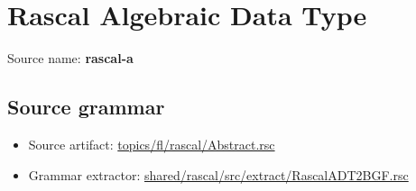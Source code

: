 \chapter{Rascal Algebraic Data Type}

 Source name: \textbf{rascal-a}

\section{Source grammar}

\begin{itemize}\item Source artifact: \href{http://github.com/grammarware/slps/blob/master/topics/fl/rascal/Abstract.rsc}{topics/fl/rascal/Abstract.rsc}\item Grammar extractor: \href{http://github.com/grammarware/slps/blob/master/shared/rascal/src/extract/RascalADT2BGF.rsc}{shared/rascal/src/extract/RascalADT2BGF.rsc}\end{itemize}

